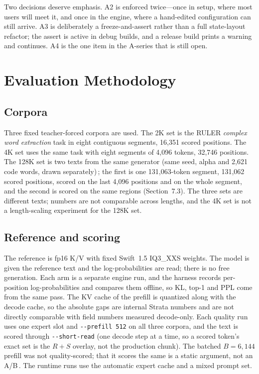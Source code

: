 \documentclass[10pt,twocolumn]{article}
\begin{document}
Two decisions deserve emphasis. A2 is enforced twice---once in setup, where most users will meet it, and once in the engine, where a hand-edited configuration can still arrive. A3 is deliberately a freeze-and-assert rather than a full state-layout refactor; the assert is active in debug builds, and a release build prints a warning and continues. A4 is the one item in the A-series that is still open.

\section{Evaluation Methodology}

\subsection{Corpora}

Three fixed teacher-forced corpora are used. The 2K set is the RULER \emph{complex word extraction} task in eight contiguous segments, 16,351 scored positions. The 4K set uses the same task with eight segments of 4,096 tokens, 32,746 positions. The 128K set is two texts from the same generator (same seed, alpha and 2,621 code words, drawn separately)\,\cite{strata-details}; the first is one 131,063-token segment, 131,062 scored positions, scored on the last 4,096 positions and on the whole segment, and the second is scored on the same regions (Section~7.3). The three sets are different texts; numbers are not comparable across lengths, and the 4K set is not a length-scaling experiment for the 128K set.

\subsection{Reference and scoring}

The reference is fp16 K/V with fixed Swift~1.5 IQ3\_XXS weights. The model is given the reference text and the log-probabilities are read; there is no free generation. Each arm is a separate engine run, and the harness records per-position log-probabilities and compares them offline, so KL, top-1 and PPL come from the same pass. The KV cache of the prefill is quantized along with the decode cache, so the absolute gaps are internal Strata numbers and are not directly comparable with field numbers measured decode-only. Each quality run uses one expert slot and \texttt{-{}-prefill 512} on all three corpora, and the text is scored through \texttt{-{}-short-read} (one decode step at a time, so a scored token's exact set is the $R{+}S$ overlay, not the production chunk). The batched $B{=}6{,}144$ prefill was not quality-scored; that it scores the same is a static argument, not an A/B\,\cite{strata-wp}. The runtime runs use the automatic expert cache and a mixed prompt set.
\end{document}
